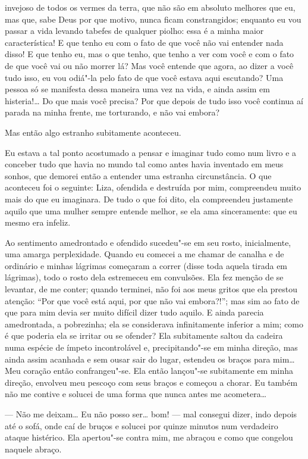 invejoso de todos os vermes da terra, que não são em absoluto melhores
que eu, mas que, sabe Deus por que motivo, nunca ficam constrangidos;
enquanto eu vou passar a vida levando tabefes de qualquer piolho: essa
é a minha maior característica! E que tenho eu com o fato de que você
não vai entender nada disso! E que tenho eu, mas o que tenho, que tenho
a ver com você e com o fato de que você vai ou não morrer lá? Mas você
entende que agora, ao dizer a você tudo isso, eu vou odiá"-la pelo fato
de que você estava aqui escutando? Uma pessoa só se manifesta dessa
maneira uma vez na vida, e ainda assim em histeria!\ldots{} Do que mais você
precisa? Por que depois de tudo isso você continua aí parada na minha
frente, me torturando, e não vai embora?

Mas então algo estranho subitamente aconteceu.

Eu estava a tal ponto acostumado a pensar e imaginar tudo como num livro
e a conceber tudo que havia no mundo tal como antes havia inventado em
meus sonhos, que demorei então a entender uma estranha circunstância. O
que aconteceu foi o seguinte: Liza, ofendida e destruída por mim,
compreendeu muito mais do que eu imaginara. De tudo o que foi dito, ela
compreendeu justamente aquilo que uma mulher sempre entende melhor, se
ela ama sinceramente: que eu mesmo era \mbox{infeliz}.

Ao sentimento amedrontado e ofendido sucedeu"-se em seu rosto,
inicialmente, uma amarga perplexidade. Quando eu comecei a me chamar de
canalha e de ordinário e minhas lágrimas começaram a correr (disse toda
aquela tirada em lágrimas), todo o rosto dela estremeceu em convulsões.
Ela fez menção de se levantar, de me conter; quando terminei, não foi
aos meus gritos que ela prestou atenção: ``Por que você está aqui, por
que não vai embora?!''; mas sim ao fato de que para mim devia ser muito
difícil dizer tudo aquilo. E ainda parecia amedrontada, a pobrezinha;
ela se considerava infinitamente inferior a mim; como é que poderia ela
se irritar ou se ofender? Ela subitamente saltou da cadeira numa
espécie de ímpeto incontrolável e, precipitando"-se em minha direção,
mas ainda assim acanhada e sem ousar sair do lugar, estendeu os braços
para mim\ldots{} Meu coração então confrangeu"-se. Ela então lançou"-se
subitamente em minha direção, envolveu meu pescoço com seus braços e
começou a chorar. Eu também não me contive e solucei de uma forma que
nunca antes me acometera\ldots{}

--- Não me deixam\ldots{} Eu não posso ser\ldots{} bom! --- mal consegui dizer, indo
depois até o sofá, onde caí de bruços e solucei por quinze minutos num
verdadeiro ataque histérico. Ela apertou"-se contra mim, me abraçou e
como que congelou naquele abraço.

